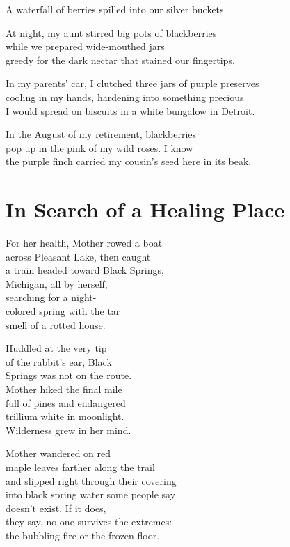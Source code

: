 \documentclass[twoside,10pt]{book}
\begin{document}
A waterfall of berries spilled into our silver buckets.

At night, my aunt stirred big pots of blackberries\\
while we prepared wide-mouthed jars\\
greedy for the dark nectar that stained our fingertips.

In my parents' car, I clutched three jars of purple preserves\\
cooling in my hands, hardening into something precious\\
I would spread on biscuits in a white bungalow in Detroit.

In the August of my retirement, blackberries\\
pop up in the pink of my wild roses. I know\\
the purple finch carried my cousin's seed here in its beak.


\clearpage
\section{In Search of a Healing Place}

For her health, Mother rowed a boat\\
across Pleasant Lake, then caught\\
a train headed toward Black Springs,\\
Michigan, all by herself,\\
searching for a night-\\
colored spring with the tar\\
smell of a rotted house.

Huddled at the very tip\\
of the rabbit's ear, Black\\
Springs was not on the route.\\
Mother hiked the final mile\\
full of pines and endangered\\
trillium white in moonlight.\\
Wilderness grew in her mind.

Mother wandered on red\\
maple leaves farther along the trail\\
and slipped right through their covering\\
into black spring water some people say\\
doesn't exist. If it does,\\
they say, no one survives the extremes:\\
the bubbling fire or the frozen floor.
\end{document}
